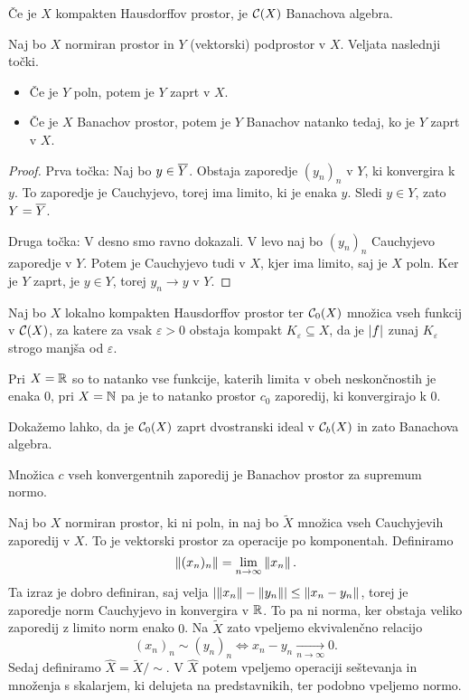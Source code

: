 \begin{posledica}
  Če je $X$ kompakten Hausdorffov prostor, je $\mathcal{C}(X)$ Banachova algebra.
\end{posledica}

\begin{trditev}
  Naj bo $X$ normiran prostor in $Y$ (vektorski) podprostor v $X$.
  Veljata naslednji točki.
  \begin{itemize}
  \item Če je $Y$ poln, potem je $Y$ zaprt v $X$.
  \item Če je $X$ Banachov prostor, potem je $Y$ Banachov natanko tedaj, ko je
	$Y$ zaprt v $X$.
  \end{itemize}
\end{trditev}

\begin{proof}
  Prva točka:
  Naj bo $y \in \overline{Y}$.
  Obstaja zaporedje $(y_n)_n$ v $Y$, ki konvergira k $y$.
  To zaporedje je Cauchyjevo, torej ima limito, ki je enaka $y$.
  Sledi $y \in Y$, zato $Y = \overline{Y}$.

  Druga točka:
  V desno smo ravno dokazali.
  V levo naj bo $(y_n)_n$ Cauchyjevo zaporedje v $Y$.
  Potem je Cauchyjevo tudi v $X$, kjer ima limito, saj je $X$ poln.
  Ker je $Y$ zaprt, je $y \in Y$, torej $y_n \to y$ v $Y$.
\end{proof}

\begin{primer}
  Naj bo $X$ lokalno kompakten Hausdorffov prostor ter $\mathcal{C}_0(X)$ množica
  vseh funkcij v $\mathcal{C}(X)$, za katere za vsak $\varepsilon > 0$ obstaja
  kompakt $K_\varepsilon \subseteq X$, da je $\left| f \right|$ zunaj $K_\varepsilon$
  strogo manjša od $\varepsilon$.

  Pri $X = \mathbb{R}$ so to natanko vse funkcije, katerih limita v obeh neskončnostih
  je enaka $0$, pri $X = \mathbb{N}$ pa je to natanko prostor $c_0$ zaporedij, ki
  konvergirajo k $0$.

  Dokažemo lahko, da je $\mathcal{C}_0(X)$ zaprt dvostranski ideal v
  $\mathcal{C}_b(X)$ in zato Banachova algebra.
\end{primer}

\begin{primer}
  Množica $c$ vseh konvergentnih zaporedij je Banachov prostor za supremum
  normo.
\end{primer}


Naj bo $X$ normiran prostor, ki ni poln, in naj bo $\tilde{X}$ množica vseh
Cauchyjevih zaporedij v $X$.
To je vektorski prostor za operacije po komponentah.
Definiramo
\[
  \left\lVert(x_n)_n\right\rVert = \lim_{n \to \infty} \left\lVert x_n\right\rVert.
\]
Ta izraz je dobro definiran, saj velja $\left| \left\lVert x_n\right\rVert - \left\lVert y_n\right\rVert \right| \le
\left\lVert x_n - y_n\right\rVert$, torej je zaporedje norm Cauchyjevo in konvergira v $\mathbb{R}$.
To pa ni norma, ker obstaja veliko zaporedij z limito norm enako $0$.
Na $\tilde{X}$ zato vpeljemo ekvivalenčno relacijo
\[
  (x_n)_n \sim (y_n)_n \iff x_n - y_n \xrightarrow[n \to \infty]{} 0.
\]
Sedaj definiramo $\hat{X} = \tilde{X} / \sim$.
V $\hat{X}$ potem vpeljemo operaciji seštevanja in množenja s skalarjem, ki
delujeta na predstavnikih, ter podobno vpeljemo normo.

